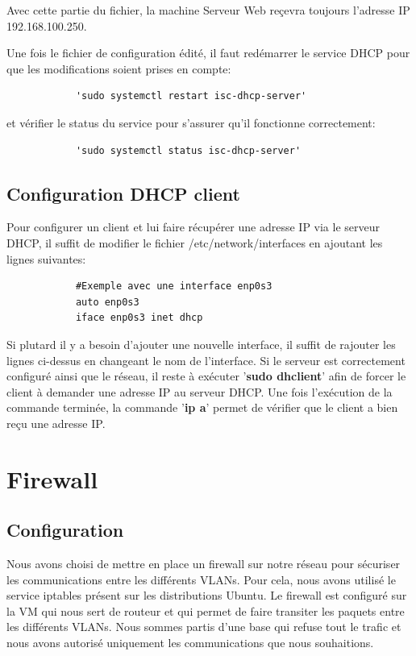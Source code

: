 \documentclass[a4paper,12pt]{report}
\begin{document}
            Avec cette partie du fichier, la machine Serveur Web reçevra toujours l'adresse IP 192.168.100.250.

            Une fois le fichier de configuration édité, il faut redémarrer le service DHCP pour que les modifications soient prises en compte:
            \begin{verbatim}
            'sudo systemctl restart isc-dhcp-server'
            \end{verbatim}
            et vérifier le status du service pour s'assurer qu'il fonctionne correctement:
            \begin{verbatim}
            'sudo systemctl status isc-dhcp-server'
            \end{verbatim}

            \subsection{Configuration DHCP client}
            Pour configurer un client et lui faire récupérer une adresse IP via le serveur DHCP, il suffit de modifier le fichier /etc/network/interfaces en ajoutant les lignes suivantes:
            \begin{verbatim}
            #Exemple avec une interface enp0s3
            auto enp0s3
            iface enp0s3 inet dhcp
            \end{verbatim}

            Si plutard il y a besoin d'ajouter une nouvelle interface, il suffit de rajouter les lignes ci-dessus en changeant le nom de l'interface.
            Si le serveur est correctement configuré ainsi que le réseau, il reste à exécuter '\textbf{sudo dhclient}' afin de forcer le client à demander une adresse IP au serveur DHCP.
            Une fois l'exécution de la commande terminée, la commande '\textbf{ip a}' permet de vérifier que le client a bien reçu une adresse IP.

        \section{Firewall}
            \subsection{Configuration}
            Nous avons choisi de mettre en place un firewall sur notre réseau pour sécuriser les communications entre les différents VLANs. Pour cela, nous avons utilisé le service iptables présent sur les distributions Ubuntu.
            Le firewall est configuré sur la VM qui nous sert de routeur et qui permet de faire transiter les paquets entre les différents VLANs. Nous sommes partis d'une base qui refuse tout le trafic et nous avons autorisé uniquement les communications que nous souhaitions.
\end{document}
